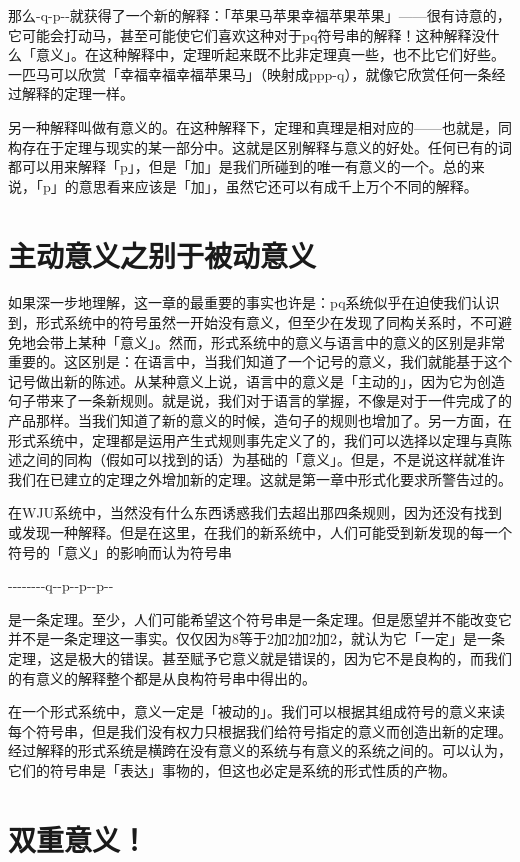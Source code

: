 \documentclass[
  12pt,
  twoside,
  openright,
  oldfontcommands,
]{memoir}
\begin{document}
那么-q-p-\/-就获得了一个新的解释：「苹果马苹果幸福苹果苹果」------很有诗意的，它可能会打动马，甚至可能使它们喜欢这种对于pq符号串的解释！这种解释没什么「意义」。在这种解释中，定理听起来既不比非定理真一些，也不比它们好些。一匹马可以欣赏「幸福幸福幸福苹果马」（映射成ppp-q），就像它欣赏任何一条经过解释的定理一样。

另一种解释叫做有意义的。在这种解释下，定理和真理是相对应的------也就是，同构存在于定理与现实的某一部分中。这就是区别解释与意义的好处。任何已有的词都可以用来解释「p」，但是「加」是我们所碰到的唯一有意义的一个。总的来说，「p」的意思看来应该是「加」，虽然它还可以有成千上万个不同的解释。

\section{主动意义之别于被动意义}

如果深一步地理解，这一章的最重要的事实也许是：pq系统似乎在迫使我们认识到，形式系统中的符号虽然一开始没有意义，但至少在发现了同构关系时，不可避免地会带上某种「意义」。然而，形式系统中的意义与语言中的意义的区别是非常重要的。这区别是：在语言中，当我们知道了一个记号的意义，我们就能基于这个记号做出新的陈述。从某种意义上说，语言中的意义是「主动的」，因为它为创造句子带来了一条新规则。就是说，我们对于语言的掌握，不像是对于一件完成了的产品那样。当我们知道了新的意义的时候，造句子的规则也增加了。另一方面，在形式系统中，定理都是运用产生式规则事先定义了的，我们可以选择以定理与真陈述之间的同构（假如可以找到的话）为基础的「意义」。但是，不是说这样就准许我们在已建立的定理之外增加新的定理。这就是第一章中形式化要求所警告过的。

在WJU系统中，当然没有什么东西诱惑我们去超出那四条规则，因为还没有找到或发现一种解释。但是在这里，在我们的新系统中，人们可能受到新发现的每一个符号的「意义」的影响而认为符号串

-\/-\/-\/-\/-\/-\/-\/-q-\/-p-\/-p-\/-p-\/-

是一条定理。至少，人们可能希望这个符号串是一条定理。但是愿望并不能改变它并不是一条定理这一事实。仅仅因为8等于2加2加2加2，就认为它「一定」是一条定理，这是极大的错误。甚至赋予它意义就是错误的，因为它不是良构的，而我们的有意义的解释整个都是从良构符号串中得出的。

在一个形式系统中，意义一定是「被动的」。我们可以根据其组成符号的意义来读每个符号串，但是我们没有权力只根据我们给符号指定的意义而创造出新的定理。经过解释的形式系统是横跨在没有意义的系统与有意义的系统之间的。可以认为，它们的符号串是「表达」事物的，但这也必定是系统的形式性质的产物。

\section{双重意义！}
\end{document}
